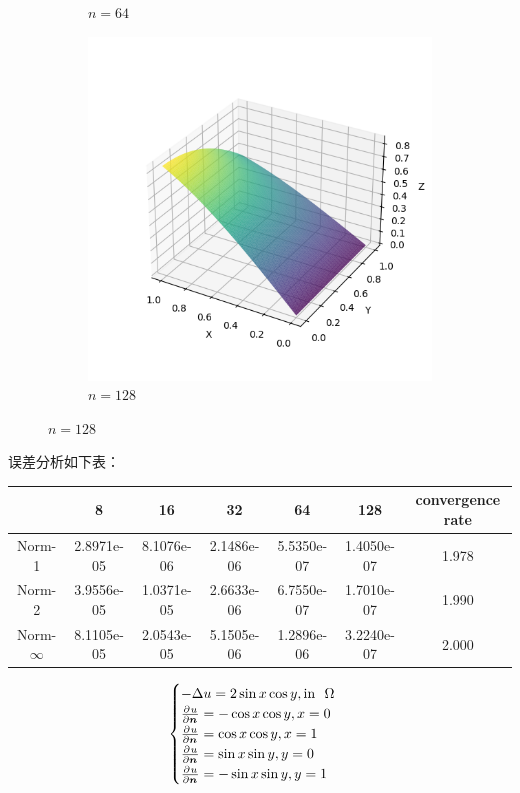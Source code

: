 \documentclass[lang=cn,a4paper,newtx,bibend=bibtex]{elegantpaper}
\begin{document}
\begin{figure}[H]
\begin{subfigure}[b]{0.18\textwidth}
      \caption{$n = 64$}
  \end{subfigure}
  \hfill
  \begin{subfigure}[b]{0.18\textwidth}
      \includegraphics[width=\textwidth]{../../res_bac/res-[data|2-Dirichlet-regular-e128].png}
      \caption{$n = 128$}
  \end{subfigure}
\end{figure}

误差分析如下表：

\begin{table}[H]
  \centering
  \begin{tabular}{|c|c|c|c|c|c|c|}
  \hline
   & 8 & 16 & 32 & 64 & 128 & convergence rate \\
  \hline
  Norm-1 & 2.8971e-05 & 8.1076e-06 & 2.1486e-06 & 5.5350e-07 & 1.4050e-07 & 1.978 \\
  Norm-2 & 3.9556e-05 & 1.0371e-05 & 2.6633e-06 & 6.7550e-07 & 1.7010e-07 & 1.990 \\
  Norm-$\infty$ & 8.1105e-05 & 2.0543e-05 & 5.1505e-06 & 1.2896e-06 & 3.2240e-07 & 2.000 \\
  \hline
  \end{tabular}
  \end{table}


\[
\begin{cases}
  - \Delta u = 2\sin x \cos y, \text{in~~} \Omega \\
  \frac{\partial^{}{u}}{\partial {\bm{n}}^{}} = - \cos x \cos y, x = 0 \\
  \frac{\partial^{}{u}}{\partial {\bm{n}}^{}} = \cos x \cos y, x = 1 \\  
  \frac{\partial^{}{u}}{\partial {\bm{n}}^{}} = \sin x \sin y, y = 0 \\
  \frac{\partial^{}{u}}{\partial {\bm{n}}^{}} = - \sin x \sin y, y = 1 \\  
\end{cases}
\]
\end{document}
